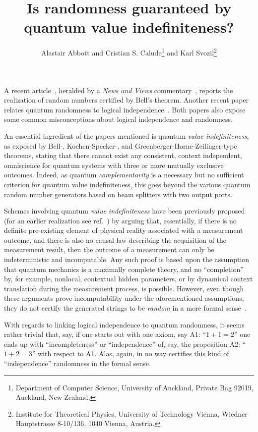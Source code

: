 \documentclass{article}
\begin{document}
\title{Is randomness guaranteed by quantum value indefiniteness?}
\author{
Alastair Abbott
and
Cristian S. Calude\footnote{Department of Computer Science, University of Auckland, Private Bag 92019, Auckland, New Zealand.}
and
Karl Svozil\footnote{Institute for Theoretical Physics, University of Technology Vienna,
Wiedner Hauptstrasse 8-10/136, 1040 Vienna,  Austria.}
}

\maketitle


A recent article~\cite{10.1038/nature09008}, heralded by a {\em News and Views} commentary~\cite{10.1038/464988a},
reports the realization of random numbers certified by {B}ell's theorem.
Another recent paper relates quantum randomness to logical independence~\cite{1367-2630-12-1-013019}.
Both papers also expose some common misconceptions about logical independence and randomness.

An essential ingredient of the papers mentioned is quantum {\em value indefiniteness}, as exposed by Bell-,
Kochen-Specker-, and Greenberger-Horne-Zeilinger-type theorems,
stating that there cannot exist any consistent, context independent, omniscience for quantum systems with three or more mutually exclusive outcomes.
Indeed, as quantum {\em complementarity} is a necessary but no sufficient criterion for quantum value indefiniteness,
this goes beyond the various quantum random number generators based on beam splitters with two output ports.

Schemes involving quantum {\em value indefiniteness} have been previously proposed~\cite{2008-cal-svo,svozil-2009-howto}
(for an earlier realization see ref.~\cite{fiorentino:032334})
by arguing that, essentially, if there is no definite pre-existing element of physical reality
associated with a measurement outcome,
and there is also no causal law describing the acquisition of the measurement result,
then the outcome of a measurement can only be indeterministic and incomputable.
Any such proof is based upon the assumption that quantum mechanics is a maximally complete theory,
and no ``completion'' by, for example, nonlocal, contextual hidden parameters, or by dynamical context translation during the measurement process, is possible.
However, even though these arguments prove incomputability under the aforementioned assumptions,
they do not certify the generated strings to be {\em random} in a more formal sense~\cite{2008-cal-svo}.

With regards to linking logical independence to quantum randomness, it seems rather trivial that, say, if one starts out with one axiom, say A1: ``$1+1=2$''
one ends up with ``incompleteness'' or ``independence'' of, say, the proposition A2: ``$1+2=3$'' with respect to A1.
Alas, again, in no way certifies this kind of ``independence'' randomness in the formal sense.


\end{document}
